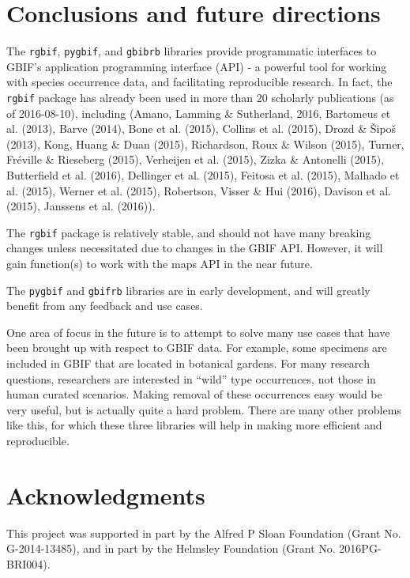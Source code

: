 \documentclass[author-year, review, 11pt]{components/elsarticle} %
\begin{document}
\section{Conclusions and future
directions}\label{conclusions-and-future-directions}

The \texttt{rgbif}, \texttt{pygbif}, and \texttt{gbibrb} libraries
provide programmatic interfaces to GBIF's application programming
interface (API) - a powerful tool for working with species occurrence
data, and facilitating reproducible research. In fact, the
\texttt{rgbif} package has already been used in more than 20 scholarly
publications (as of 2016-08-10), including (Amano, Lamming \&
Sutherland, 2016, Bartomeus et al. (2013), Barve (2014), Bone et al.
(2015), Collins et al. (2015), Drozd \& Šipoš (2013), Kong, Huang \&
Duan (2015), Richardson, Roux \& Wilson (2015), Turner, Fréville \&
Rieseberg (2015), Verheijen et al. (2015), Zizka \& Antonelli (2015),
Butterfield et al. (2016), Dellinger et al. (2015), Feitosa et al.
(2015), Malhado et al. (2015), Werner et al. (2015), Robertson, Visser
\& Hui (2016), Davison et al. (2015), Janssens et al. (2016)).

The \texttt{rgbif} package is relatively stable, and should not have
many breaking changes unless necessitated due to changes in the GBIF
API. However, it will gain function(s) to work with the maps API in the
near future.

The \texttt{pygbif} and \texttt{gbifrb} libraries are in early
development, and will greatly benefit from any feedback and use cases.

One area of focus in the future is to attempt to solve many use cases
that have been brought up with respect to GBIF data. For example, some
specimens are included in GBIF that are located in botanical gardens.
For many research questions, researchers are interested in ``wild'' type
occurrences, not those in human curated scenarios. Making removal of
these occurrences easy would be very useful, but is actually quite a
hard problem. There are many other problems like this, for which these
three libraries will help in making more efficient and reproducible.

\section{Acknowledgments}\label{acknowledgments}

This project was supported in part by the Alfred P Sloan Foundation
(Grant No. G-2014-13485), and in part by the Helmsley Foundation (Grant
No. 2016PG-BRI004).
\end{document}
